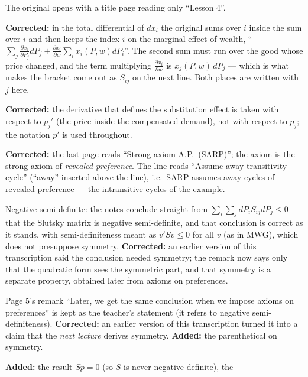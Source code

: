 \documentclass[11pt]{article}
\begin{document}
\begin{transcriptnotes}
  \item The original opens with a title page reading only ``Lesson 4''.
  \item \textbf{Corrected:} in the total differential of $dx_i$ the original sums
        over $i$ inside the sum over $i$ and then keeps the index $i$ on the
        marginal effect of wealth,
        ``$\sum_j\frac{\partial x_i}{\partial P_j}dP_j
        +\frac{\partial x_i}{\partial w}\sum_ix_i(P,w)dP_i$''. The second sum must
        run over the good whose price changed, and the term multiplying
        $\frac{\partial x_i}{\partial w}$ is $x_j(P,w)\,dP_j$ --- which is what makes
        the bracket come out as $S_{ij}$ on the next line. Both places are written
        with $j$ here.
  \item \textbf{Corrected:} the derivative that defines the substitution effect is
        taken with respect to $p_j'$ (the price inside the compensated demand), not
        with respect to $p_j$; the notation $p'$ is used throughout.
  \item \textbf{Corrected:} the last page reads ``Strong axiom A.P.\ (SARP)''; the
        axiom is the strong axiom of \emph{revealed preference}. The line reads
        ``Assume away transitivity cycle'' (``away'' inserted above the line),
        i.e.\ SARP assumes away cycles of revealed preference --- the
        intransitive cycles of the example.
  \item Negative semi-definite: the notes conclude straight from
        $\sum_i\sum_j dP_iS_{ij}dP_j\le0$ that the Slutsky matrix is negative
        semi-definite, and that conclusion is correct as it stands, with
        semi-definiteness meant as $v'Sv\le0$ for all $v$ (as in MWG), which
        does not presuppose symmetry. \textbf{Corrected:} an earlier version of
        this transcription said the conclusion needed symmetry; the remark now says
        only that the quadratic form sees the symmetric part, and that symmetry is
        a separate property, obtained later from axioms on preferences.
  \item Page 5's remark ``Later, we get the same conclusion when we impose axioms
        on preferences'' is kept as the teacher's statement (it refers to negative
        semi-definiteness). \textbf{Corrected:} an earlier version of this
        transcription turned it into a claim that the \emph{next lecture} derives
        symmetry. \textbf{Added:} the parenthetical on symmetry.
  \item \textbf{Added:} the result $Sp=0$ (so $S$ is never negative definite), the

\end{transcriptnotes}
\end{document}
